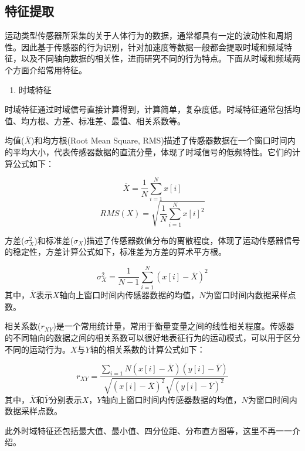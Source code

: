 \subsection{特征提取}
\par 运动类型传感器所采集的关于人体行为的数据，通常都具有一定的波动性和周期性。因此基于传感器的行为识别，针对加速度等数据一般都会提取时域和频域特征，以及不同轴向数据的相关性，进而研究不同的行为特点。下面从时域和频域两个方面介绍常用特征。

\begin{enumerate}[(1)]
	\item 时域特征
\end{enumerate}
\par 时域特征通过时域信号直接计算得到，计算简单，复杂度低。时域特征通常包括均值、均方根、方差、标准差、最值、相关系数等。

\par 均值($\overline{X}$)和均方根(Root Mean Square, RMS)描述了传感器数据在一个窗口时间内的平均大小，代表传感器数据的直流分量，体现了时域信号的低频特性。它们的计算公式如下：

\begin{equation}
	\overline{X} = \frac{1}{N}\sum_{i=1}^{N}x[i]
\end{equation}
\begin{equation}
	RMS(X) = \sqrt{\frac{1}{N}\sum_{i=1}^{N}x[i]^2}
\end{equation}
\par 方差($\sigma_X^2$)和标准差($\sigma_X$)描述了传感器数值分布的离散程度，体现了运动传感器信号的稳定性，方差计算公式如下，标准差为方差的算术平方根。

\begin{equation}
	\sigma_X^2 = \frac{1}{N-1}\sum_{i=1}^{N}(x[i]-\overline{X})^2
\end{equation}
其中，$\overline{X}$表示$X$轴向上窗口时间内传感器数据的均值，$N$为窗口时间内数据采样点数。
\par 相关系数($r_{XY}$)是一个常用统计量，常用于衡量变量之间的线性相关程度。传感器的不同轴向的数据之间的相关系数可以很好地表征行为的运动模式，可以用于区分不同的运动行为。$X$与$Y$轴的相关系数的计算公式如下：

\begin{equation}
	r_{XY} = \frac{\sum_{i=1}{N}(x[i] - \overline{X})(y[i] - \overline{Y})}{\sqrt{(x[i] - \overline{X})^2}\sqrt{(y[i] - \overline{Y})^2}}
\end{equation}
其中，$\overline{X}$和$\overline{Y}$分别表示$X$，$Y$轴向上窗口时间内传感器数据的均值，$N$为窗口时间内数据采样点数。
\par 此外时域特征还包括最大值、最小值、四分位距、分布直方图等，这里不再一一介绍。

